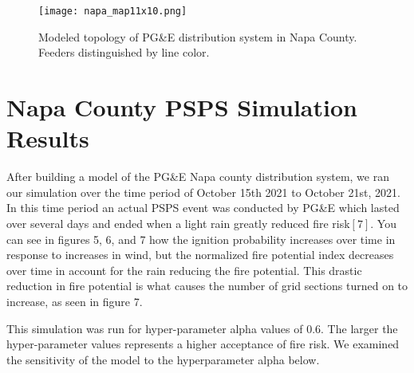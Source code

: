\documentclass{article}
\begin{document}
\begin{figure}[H]
    \centering
    \texttt{[image: napa\_map11x10.png]}
    \caption{Modeled topology of PG&E distribution system in Napa County. Feeders distinguished by line color.}
\end{figure}



\section{Napa County PSPS Simulation Results}


After building a model of the PG&E Napa county distribution system, we ran our simulation over the time period of October 15th 2021 to October 21st, 2021. In this time period an actual PSPS event was conducted by PG&E which lasted over several days and ended when a light rain greatly reduced fire risk$[7]$.  You can see in figures 5, 6, and 7 how the ignition probability increases over time in response to increases in wind, but the normalized fire potential index decreases over time in account for the rain reducing the fire potential. This drastic reduction in fire potential is what causes the number of grid sections turned on to increase, as seen in figure 7. 

This simulation was run for hyper-parameter alpha values of 0.6. The larger the hyper-parameter values represents a higher acceptance of fire risk. We examined the sensitivity of the model to the hyperparameter alpha below.
\end{document}
